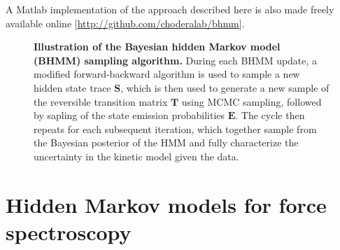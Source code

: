 \documentclass[aps,pre,twocolumn,superscriptaddress,nofootinbib,longbibliography]{revtex4-1}
\begin{document}
{{%
A Matlab implementation of the approach described here is also made freely available online [\url{http://github.com/choderalab/bhmm}].
}

\begin{figure}[tb]
\noindent
{}
\caption{{\bf Illustration of the Bayesian hidden Markov model (BHMM) sampling algorithm.}
During each BHMM update, a modified forward-backward algorithm is used to sample a new hidden state trace $\mathbf{S}$, which is then used to generate a new sample of the reversible transition matrix $\mathbf{T}$ using MCMC sampling, followed by sapling of the state emission probabilities $\mathbf{E}$.
The cycle then repeats for each subsequent iteration, which together sample from the Bayesian posterior of the HMM and fully characterize the uncertainty in the kinetic model given the data.
\label{figure:bhmm-workflow}}
\end{figure}


\section{Hidden Markov models for force spectroscopy}
\label{section:theory}

}
\end{document}
